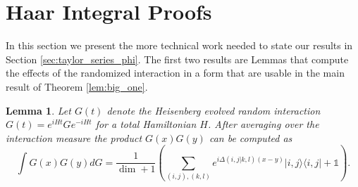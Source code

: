 \documentclass{article}
\newtheorem{lemma}[theorem]{Lemma}
\newcommand{\ketbra}[2]{| #1\rangle\! \langle #2|}
\newcommand{\parens}[1]{\left( #1 \right)}
\newcommand{\identity}{\mathds{1}}
\begin{document}
\section{Haar Integral Proofs} \label{sec:haar_integral_appendix}

In this section we present the more technical work needed to state our results in Section \ref{sec:taylor_series_phi}. The first two results are Lemmas that compute the effects of the randomized interaction in a form that are usable in the main result of Theorem \ref{lem:big_one}.

\begin{lemma} \label{lem:two_heisenberg_interactions}
    Let $G(t)$ denote the Heisenberg evolved random interaction $G(t) = e^{iHt} G e^{-iHt}$ for a total Hamiltonian $H$. After averaging over the interaction measure the product $G(x) G(y)$ can be computed as
    \begin{equation}
        \int G(x) G(y) dG = \frac{1}{\dim + 1} \parens{\sum_{(i,j),(k,l)} e^{i \Delta(i,j|k,l) (x-y)} \ketbra{i,j}{i,j} + \identity}.
    \end{equation}
\end{lemma}
\end{document}

